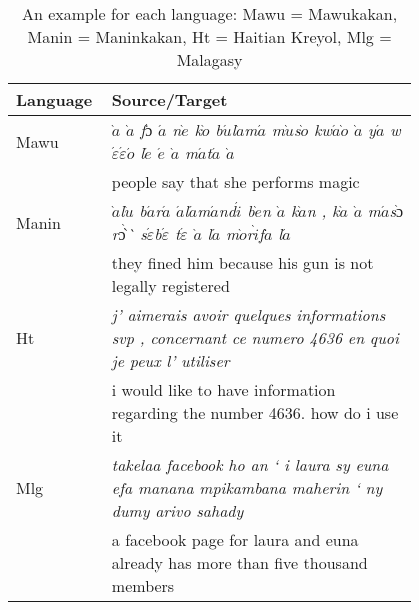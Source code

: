 
\begin{table*}
	\setlength{\tabcolsep}{4.5pt}
	\small
	\small
	\begin{tabular}{p{0.1\linewidth}p{0.7\linewidth}}
	\toprule
	Language & Source/Target \\
	\toprule
	Mawu & \emph{$\grave{a}$ $\grave{a}$ f$\acute{ɔ}$ $\acute{a}$ n$\grave{e}$ k$\grave{o}$ b$\acute{u}$l$\grave{a}$m$\acute{a}$ m$\grave{u}$s$\grave{o}$ kw$\acute{a}$$\grave{o}$ $\grave{a}$ y$\acute{a}$ w$\acute{\varepsilon}$$\acute{\varepsilon}$$\acute{o}$ l$\acute{e}$ $\acute{e}$ $\grave{a}$ m$\acute{a}$t$\acute{a}$
	$\grave{a}$} \\
	 & people say that she performs magic\\
	\midrule
	Manin & \emph{$\grave{a}$l$\grave{u}$  b$\acute{a}$r$\acute{a}$ $\acute{a}$l$\acute{a}$m$\acute{a}$nd$\acute{i}$ b$\grave{e}$n $\grave{a}$ k$\grave{a}$n , k$\grave{a}$ $\grave{a}$ m$\acute{a}$s$\grave{ɔ}$r$\grave{ɔ̀}$̀  s$\acute{\varepsilon}$b$\acute{\varepsilon}$ t$\acute{\varepsilon}$ $\grave{a}$ l$\acute{a}$ 
	m$\grave{o}$r$\grave{i}$f$\grave{a}$ l$\acute{a}$} \\

	  & they fined him because his gun is not legally registered\\
	\midrule
	Ht & \emph{j' aimerais avoir quelques informations svp , concernant ce numero 4636 en quoi je peux l' utiliser} \\

	&	 i would like to have information regarding the number 4636. how do i use it\\
	\midrule
	
	Mlg & \emph{takelaa facebook ho an ` i laura sy euna efa manana mpikambana maherin  ` ny dumy arivo sahady} \\
	 & a facebook page for laura and euna already has more than five thousand members\\
	\bottomrule
	\end{tabular}
	\caption{An example for each language: Mawu = Mawukakan, Manin = Maninkakan, Ht = Haitian Kreyol, Mlg = Malagasy}
	\label{table:example_each}
\end{table*}
		
